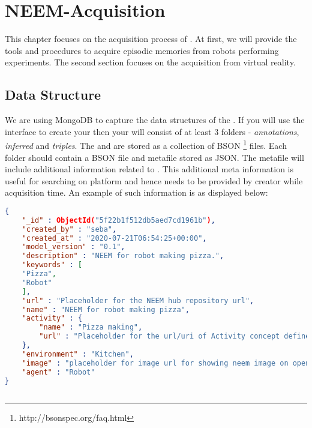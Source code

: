 \chapter{NEEM-Acquisition}
\label{ch:acquisition}

This chapter focuses on the acquisition process of \neems.
At first, we will provide the tools and procedures to acquire episodic memories from robots performing experiments.
The second section focuses on the \neem acquisition from virtual reality. 




\section{Data Structure}

We are using MongoDB to capture the data structures of the \neems.
If you will use the \knowrob interface to create your \neems then your \neem will consist of at least 3 folders - \textit{annotations}, \textit{inferred} and \textit{triples}.
The \neemnar and \neemexp are stored as a collection of BSON \footnote{http://bsonspec.org/faq.html} files.
Each folder should contain a BSON file and metafile stored as JSON. The metafile will include additional information related to \neems. This additional meta information is useful for searching \neem on \openease platform and hence needs to be provided by \neem creator while \neem acquisition time. An example of such information is as displayed below:

\begin{lstlisting}[language=json,firstnumber=1]
{
	"_id" : ObjectId("5f22b1f512db5aed7cd1961b"), 
	"created_by" : "seba",
	"created_at" : "2020-07-21T06:54:25+00:00",
	"model_version" : "0.1",
	"description" : "NEEM for robot making pizza.",
	"keywords" : [	
	"Pizza",
	"Robot"
	],
	"url" : "Placeholder for the NEEM hub repository url",
	"name" : "NEEM for robot making pizza",
	"activity" : {
		"name" : "Pizza making",
		"url" : "Placeholder for the url/uri of Activity concept defined in ontology"    
	},
	"environment" : "Kitchen",
	"image" : "placeholder for image url for showing neem image on openEASE",  
	"agent" : "Robot"
}
	
\end{lstlisting}

